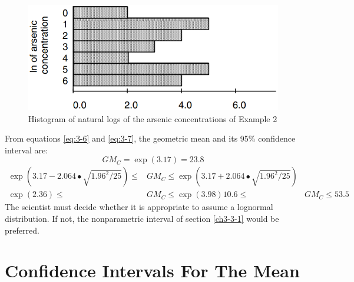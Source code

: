 \documentclass[]{book}
\begin{document}
\begin{figure}

{\centering \includegraphics[width=11.22in]{figures/3_6} 

}

\caption{Histogram of natural logs of the arsenic concentrations of Example 2}\label{fig:fig-3-6}
\end{figure}

From equations \eqref{eq:3-6} and \eqref{eq:3-7}, the geometric mean and its 95\% confidence interval are: \[GM_{C} = \exp{(3.17)} = 23.8\]
\begin{equation}
\begin{aligned}
\exp{\left( 3.17 - 2.064 \bullet \sqrt{1.96^{2} / 25} \right)} \leq &GM_{C} \leq \exp{\left( 3.17 + 2.064 \bullet \sqrt{1.96^{2} / 25} \right)} \\
\exp{(2.36)} \leq &GM_{C} \leq \exp{(3.98)}
10.6 \leq &GM_{C} \leq 53.5
\end{aligned}
\end{equation}
The scientist must decide whether it is appropriate to assume a lognormal distribution. If not, the nonparametric interval of section \ref{ch3-3-1} would be preferred.

\hypertarget{ch3-4}{%
\section{Confidence Intervals For The Mean}\label{ch3-4}}
\end{document}
